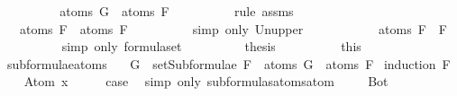 \begin{isabellebody}
\ \ \ \ \ \ \isamarkupfalse%
\ \isamarkupfalse%
\ {\isachardoublequoteopen}atoms\ G\ {\isasymsubseteq}\ atoms\ F{}{\isachardoublequoteclose}\isanewline
\ \ \ \ \ \ \ \ \isamarkupfalse%
\ {\isacharparenleft}rule\ assms{\isacharparenleft}{}{\isacharparenright}{\isacharparenright}\isanewline
\ \ \ \ \ \ \isamarkupfalse%
\ \isamarkupfalse%
\ {\isachardoublequoteopen}{\isasymdots}\ {\isasymsubseteq}\ atoms\ F{}\ {\isasymunion}\ atoms\ F{}{\isachardoublequoteclose}\isanewline
\ \ \ \ \ \ \ \ \isamarkupfalse%
\ {\isacharparenleft}simp\ only{\isacharcolon}\ Un{\isacharunderscore}upper{}{\isacharparenright}\isanewline
\ \ \ \ \ \ \isamarkupfalse%
\ \isamarkupfalse%
\ {\isachardoublequoteopen}{\isasymdots}\ {\isacharequal}\ atoms\ {\isacharparenleft}F{}\ \isactrlbold {\isasymrightarrow}\ F{}{\isacharparenright}{\isachardoublequoteclose}\isanewline
\ \ \ \ \ \ \ \ \isamarkupfalse%
\ {\isacharparenleft}simp\ only{\isacharcolon}\ formula{\isachardot}set{\isacharparenleft}{}{\isacharparenright}{\isacharparenright}\isanewline
\ \ \ \ \ \ \isamarkupfalse%
\ \isamarkupfalse%
\ {\isacharquery}thesis\isanewline
\ \ \ \ \ \ \ \ \isamarkupfalse%
\ this\isanewline
\ \ \ \ \isamarkupfalse%
\isanewline
\ \ \isamarkupfalse%
\isanewline
{}\isamarkupfalse%
%
\endisatagproof
{\isafoldproof}%
%
\isadelimproof
\isanewline
%
\endisadelimproof
\isanewline
{}\isamarkupfalse%
\ subformulae{\isacharunderscore}atoms{\isacharcolon}\ \isanewline
\ \ {\isachardoublequoteopen}G\ {\isasymin}\ setSubformulae\ F\ {\isasymLongrightarrow}\ atoms\ G\ {\isasymsubseteq}\ atoms\ F{\isachardoublequoteclose}\isanewline
%
\isadelimproof
%
\endisadelimproof
%
\isatagproof
{}\isamarkupfalse%
\ {\isacharparenleft}induction\ F{\isacharparenright}\isanewline
\ \ \isamarkupfalse%
\ {\isacharparenleft}Atom\ x{\isacharparenright}\isanewline
\ \ \isamarkupfalse%
\ \isamarkupfalse%
\ {\isacharquery}case\ \isamarkupfalse%
\ {\isacharparenleft}simp\ only{\isacharcolon}\ subformulas{\isacharunderscore}atoms{\isacharunderscore}atom{\isacharparenright}\ \isanewline
{}\isamarkupfalse%
\isanewline
\ \ \isamarkupfalse%
\ Bot\isanewline
\ \ \isamarkupfalse%

\end{isabellebody}
